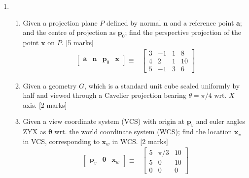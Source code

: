 \documentclass[11pt]{qptiet}
\begin{document}
\begin{enumerate}[resume]
\item \begin{enumerate}
\item Given a projection plane \(P\) defined by normal
\(\textbf{n}\) and a reference point \(\textbf{a}\);
and the centre of projection as \(\mathbf{p}_0\);
find the perspective projection of the point
\(\textbf{x}\) on \(P\). \hfill [5 marks]
\begin{align*}
  \begin{bmatrix}
    \mathbf{a}&\mathbf{n}&\mathbf{p}_0&\mathbf{x}
  \end{bmatrix}\equiv
  &
    \begin{bmatrix}
      3&-1&1&8\\4&2&1&10\\5&-1&3&6
    \end{bmatrix}
\end{align*}
\item Given a geometry \(G\), which is a standard unit
cube scaled uniformly by half and viewed through
a Cavelier projection bearing \(\theta=\pi/4\)
wrt. \(X\) axis. \hfill [2 marks]
\item Given a view coordinate system (VCS) with origin
at \(\textbf{p}_v\) and euler angles ZYX as
\(\boldsymbol{\theta}\) wrt. the world coordinate
system (WCS); find the location \(\mathbf{x}_v\) in
VCS, corresponding to \(\textbf{x}_w\) in
WCS. \hfill [2 marks]
\begin{align*}
  \begin{bmatrix}
    \mathbf{p}_v & \boldsymbol{\theta} & \mathbf{x}_w
  \end{bmatrix}\equiv
  &\begin{bmatrix}
    5&\pi/3&10\\5&0&10\\0&0&0
  \end{bmatrix}
\end{align*}
\end{enumerate}
\end{enumerate}

\bvrhrule
\end{document}
